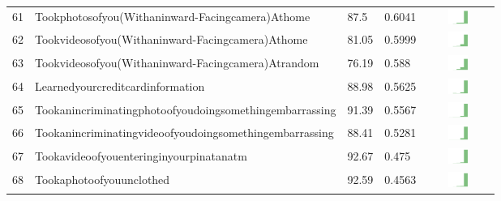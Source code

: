 \documentclass[a4paper,12pt]{article}
\begin{document}
\begin{longtable}{| p{0.5cm} | p{7cm} | p{1cm} |p{1cm} | c |}
61 & Tookphotosofyou(Withaninward-Facingcamera)Athome & 87.5 & 0.6041&\includegraphics[width = 2cm, height = 0.5cm]{tables/tookphotosofyou(withaninward-facingcamera)athomecombined} \\ 
62 & Tookvideosofyou(Withaninward-Facingcamera)Athome & 81.05 & 0.5999&\includegraphics[width = 2cm, height = 0.5cm]{tables/tookvideosofyou(withaninward-facingcamera)athomecombined} \\ 
63 & Tookvideosofyou(Withaninward-Facingcamera)Atrandom & 76.19 & 0.588&\includegraphics[width = 2cm, height = 0.5cm]{tables/tookvideosofyou(withaninward-facingcamera)atrandomcombined} \\ 
64 & Learnedyourcreditcardinformation & 88.98 & 0.5625&\includegraphics[width = 2cm, height = 0.5cm]{tables/learnedyourcreditcardinformationcombined} \\ 
65 & Tookanincriminatingphotoofyoudoingsomethingembarrassing & 91.39 & 0.5567&\includegraphics[width = 2cm, height = 0.5cm]{tables/tookanincriminatingphotoofyoudoingsomethingembarrassingcombined} \\ 
66 & Tookanincriminatingvideoofyoudoingsomethingembarrassing & 88.41 & 0.5281&\includegraphics[width = 2cm, height = 0.5cm]{tables/tookanincriminatingvideoofyoudoingsomethingembarrassingcombined} \\ 
67 & Tookavideoofyouenteringinyourpinatanatm & 92.67 & 0.475&\includegraphics[width = 2cm, height = 0.5cm]{tables/tookavideoofyouenteringinyourPINatanATMcombined} \\ 
68 & Tookaphotoofyouunclothed & 92.59 & 0.4563&\includegraphics[width = 2cm, height = 0.5cm]{tables/tookaphotoofyouunclothedcombined} \\ 

\end{longtable}
\end{document}
